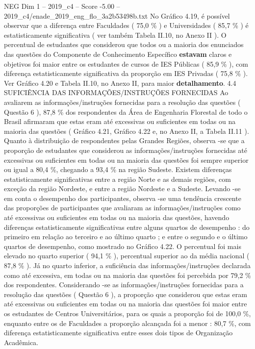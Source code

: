 \begin{textsample}{NEG Dim 1 – 2019\_c4 – Score -5.00 – 2019\_c4/enade\_2019\_eng\_flo\_3a2b53498b.txt}
No Gráfico 4.19, é possível observar que a diferença entre Faculdades ( 75,0 \% ) e Universidades ( 85,7 \% ) é estatisticamente significativa ( ver também Tabela II.10, no Anexo II ).
O percentual de estudantes que considerou que todos ou a maioria dos enunciados das questões do Componente de Conhecimento Específico \textbf{estavam} claros e objetivos foi maior entre os estudantes de cursos de IES Públicas ( 85,9 \% ), com diferença estatisticamente significativa da proporção em IES Privadas ( 75,8 \% ).
Ver Gráfico 4.20 e Tabela II.10, no Anexo II, para maior \textbf{detalhamento}. 4.4 SUFICIÊNCIA DAS INFORMAÇÕES/INSTRUÇÕES FORNECIDAS Ao avaliarem as informações/instruções fornecidas para a resolução das questões ( Questão 6 ), 87,8 \% dos respondentes da Área de Engenharia Florestal de todo o Brasil afirmaram que estas eram até excessivas ou suficientes em todas ou na maioria das questões ( Gráfico 4.21, Gráfico 4.22 e, no Anexo II, a Tabela II.11 ).
Quanto à distribuição de respondentes pelas Grandes Regiões, observa -se que a proporção de estudantes que considerou as informações/instruções fornecidas até excessivas ou suficientes em todas ou na maioria das questões foi sempre superior ou igual a 80,4 \%, chegando a 93,4 \% na região Sudeste.
Existem diferenças estatisticamente significativas entre a região Norte e as demais regiões, com exceção da região Nordeste, e entre a região Nordeste e a Sudeste.
Levando -se em conta o desempenho dos participantes, observa -se uma tendência crescente das proporções de participantes que avaliaram as informações/instruções como até excessivas ou suficientes em todas ou na maioria das questões, havendo diferenças estatisticamente significativas entre alguns quartos de desempenho : do primeiro em relação ao terceiro e ao último quarto ; e entre o segundo e o último quartos de desempenho, como mostrado no Gráfico 4.22.
O percentual foi mais elevado no quarto superior ( 94,1 \% ), percentual superior ao da média nacional ( 87,8 \% ).
Já no quarto inferior, a suficiência das informações/instruções declarada como até excessiva, em todas ou na maioria das questões foi percebida por 79,2 \% dos respondentes.
Considerando -se as informações/instruções fornecidas para a resolução das questões ( Questão 6 ), a proporção que considerou que estas eram até excessivas ou suficientes em todas ou na maioria das questões foi maior entre os estudantes de Centros Universitários, para os quais a proporção foi de 100,0 \%, enquanto entre os de Faculdades a proporção alcançada foi a menor : 80,7 \%, com diferença estatisticamente significativa entre esses dois tipos de Organização Acadêmica.

\end{textsample}
